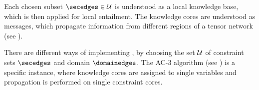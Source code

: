 Each chosen subset $\secedges\in\arbset$ is understood as a local knowledge base, which is then applied for local entailment.
The knowledge cores are understood as messages, which propagate information from different regions of a tensor network (see ).

There are different ways of implementing , by choosing the set $\mathcal{U}$ of constraint sets $\secedges$ and domain $\domainedges$. %
The AC-3 algorithm (see \cite{mackworth_consistency_1977}) is a specific instance, where knowledge cores are assigned to single variables and propagation is performed on single constraint cores.


